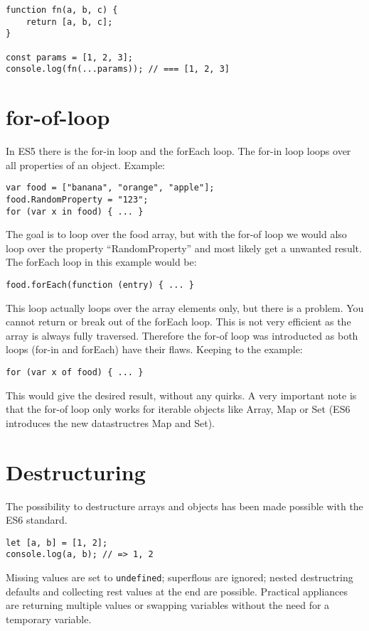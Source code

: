 \documentclass{bioinfo}
\begin{document}
\begin{lstlisting}
function fn(a, b, c) {
    return [a, b, c];
}

const params = [1, 2, 3];
console.log(fn(...params)); // === [1, 2, 3]
\end{lstlisting}

\section{for-of-loop}
In ES5 there is the for-in loop and the forEach loop.
The for-in loop loops over all properties of an object. Example:

\begin{lstlisting}
var food = ["banana", "orange", "apple"];
food.RandomProperty = "123";
for (var x in food) { ... }
\end{lstlisting}

The goal is to loop over the food array, but with the for-of loop we would
also loop over the property “RandomProperty” and most likely get a unwanted result.
The forEach loop in this example would be:
\begin{lstlisting}
food.forEach(function (entry) { ... }
\end{lstlisting}
This loop actually loops over the array elements only, but there is a problem.
You cannot return or break out of the forEach loop. This is not very efficient
as the array is always fully traversed. Therefore the for-of loop was introducted
as both loops (for-in and forEach) have their flaws.
Keeping to the example:
\begin{lstlisting}
for (var x of food) { ... }
\end{lstlisting}

This would give the desired result, without any quirks. A very important note is
that the for-of loop only works for iterable objects like Array, Map or Set
(ES6 introduces the new datastructres Map and Set).

\section{Destructuring}
The possibility to destructure arrays and objects has been made possible with
the ES6 standard.

\begin{lstlisting}
let [a, b] = [1, 2];
console.log(a, b); // => 1, 2
\end{lstlisting}

Missing values are set to {\tt undefined}; superflous are ignored; nested destructring
defaults and collecting rest values at the end are possible.
Practical appliances are returning multiple values or swapping variables
without the need for a temporary variable.
\end{document}
